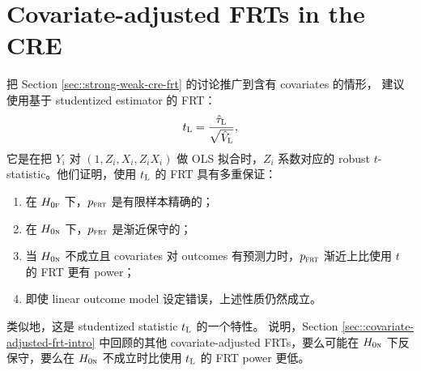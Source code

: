 
 
 
\section{Covariate-adjusted FRTs in the CRE}
 \label{sec::xfrt-cre}
 
把 Section \ref{sec::strong-weak-cre-frt} 的讨论推广到含有 covariates 的情形，\citet{zhao2020caFRT} 建议使用基于 studentized \citet{lin2013} estimator 的 FRT：
$$
t_\textsc{L}   =  \frac{  \hat{\tau}_\textsc{L} }{  \sqrt{\hat{V}_\textsc{L}}  },
$$ 
它是在把 $Y_i$ 对 $( 1, Z_i, X_i, Z_i X_i) $ 做 OLS 拟合时，$Z_i$ 系数对应的 robust $t$-statistic。他们证明，使用 $t_\textsc{L} $ 的 FRT 具有多重保证：
 \begin{enumerate}
\item
 在 $H_{0\textsc{f}}$ 下，$p_{\textsc{frt}}$ 是有限样本精确的；
\item
 在 $H_{0\textsc{n}}$ 下，$p_{\textsc{frt}}$ 是渐近保守的；
\item
 当 $H_{0\textsc{n}}$ 不成立且 covariates 对 outcomes 有预测力时，$p_{\textsc{frt}}$ 渐近上比使用 $t$ 的 FRT 更有 power；
\item
 即使 linear outcome model 设定错误，上述性质仍然成立。
\end{enumerate}
类似地，这是 studentized statistic $t_\textsc{L} $ 的一个特性。\citet{zhao2020caFRT} 说明，Section \ref{sec::covariate-adjusted-frt-intro} 中回顾的其他 covariate-adjusted FRTs，要么可能在 $H_{0\textsc{n}}$ 下反保守，要么在 $H_{0\textsc{n}}$ 不成立时比使用 $t_\textsc{L} $ 的 FRT power 更低。

